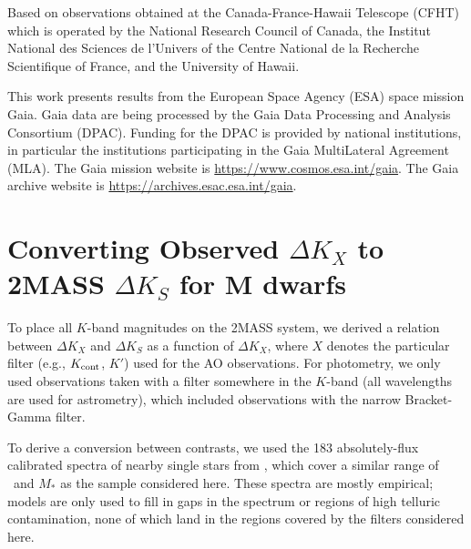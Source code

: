 \documentclass[twocolumn]{aastex62}
\begin{document}
Based on observations obtained at the Canada-France-Hawaii Telescope (CFHT) which is operated by the National Research Council of Canada, the Institut National des Sciences de l'Univers of the Centre National de la Recherche Scientifique of France, and the University of Hawaii. 

This work presents results from the European Space Agency (ESA) space mission Gaia. Gaia data are being processed by the Gaia Data Processing and Analysis Consortium (DPAC). Funding for the DPAC is provided by national institutions, in particular the institutions participating in the Gaia MultiLateral Agreement (MLA). The Gaia mission website is \href{https://www.cosmos.esa.int/gaia}{https://www.cosmos.esa.int/gaia}. The Gaia archive website is \href{https://archives.esac.esa.int/gaia}{https://archives.esac.esa.int/gaia}.





\clearpage




\appendix 
\section{Converting Observed $\Delta K_X$ to 2MASS $\Delta K_S$ for M dwarfs} \label{sec:a1}
To place all $K$-band magnitudes on the 2MASS system, we derived a relation between $\Delta K_X$ and $\Delta K_S$ as a function of $\Delta K_X$, where $X$ denotes the particular filter (e.g., $K_{\rm{cont}}$, $K'$) used for the AO observations. For photometry, we only used observations taken with a filter somewhere in the $K$-band (all wavelengths are used for astrometry), which included observations with the narrow Bracket-Gamma filter. 

To derive a conversion between contrasts, we used the 183 absolutely-flux calibrated spectra of nearby single stars from \citet{Mann2015b}, which cover a similar range of \teff\ and $M_*$ as the sample considered here. These spectra are mostly empirical; models are only used to fill in gaps in the spectrum or regions of high telluric contamination, none of which land in the regions covered by the filters considered here.
\end{document}
